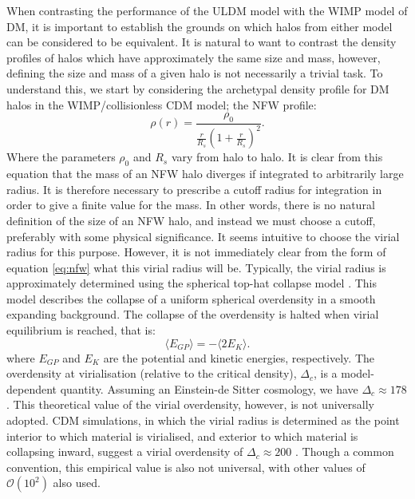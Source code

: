 \documentclass[a4paper,11pt]{article}
\begin{document}
When contrasting the performance of the ULDM model with the WIMP model of DM, it is important to establish the grounds on which halos from either model can be considered to be equivalent. It is natural to want to contrast the density profiles of halos which have approximately the same size and mass, however, defining the size and mass of a given halo is not necessarily a trivial task. To understand this, we start by considering the archetypal density profile for DM halos in the WIMP/collisionless CDM model; the NFW profile:
\begin{equation}\label{eq:nfw}
    \rho(r)=\frac{\rho_0}{\frac{r}{R_s}\left(1+\frac{r}{R_s}\right)^2}.
\end{equation}
Where the parameters $\rho_0$ and $R_s$ vary from halo to halo. It is clear from this equation that the mass of an NFW halo diverges if integrated to arbitrarily large radius. It is therefore necessary to prescribe a cutoff radius for integration in order to give a finite value for the mass. In other words, there is no natural definition of the size of an NFW halo, and instead we must choose a cutoff, preferably with some physical significance. It seems intuitive to choose the virial radius for this purpose. However, it is not immediately clear from the form of equation \ref{eq:nfw} what this virial radius will be. Typically, the virial radius is approximately determined using the spherical top-hat collapse model \cite{spherical collapse}. This model describes the collapse of a uniform spherical overdensity in a smooth expanding background. The collapse of the overdensity is halted when virial equilibrium is reached, that is: 
\begin{equation}\label{eq:virial}
    \langle E_{GP}\rangle = -\langle 2E_K\rangle.
\end{equation}
where $E_{GP}$ and $E_{K}$ are the potential and kinetic energies, respectively. The overdensity at virialisation (relative to the critical density), $\Delta_c$, is a model-dependent quantity. Assuming an Einstein-de Sitter cosmology, we have $\Delta_c\approx 178$ \cite{REF}. This theoretical value of the virial overdensity, however, is not universally adopted. CDM simulations, in which the virial radius is determined as the point interior to which material is virialised, and exterior to which material is collapsing inward, suggest a virial overdensity of $\Delta_c\approx 200$ \cite{REF}. Though a common convention, this empirical value is also not universal, with other values of $\mathcal{O}(10^2)$ also used.
\end{document}
